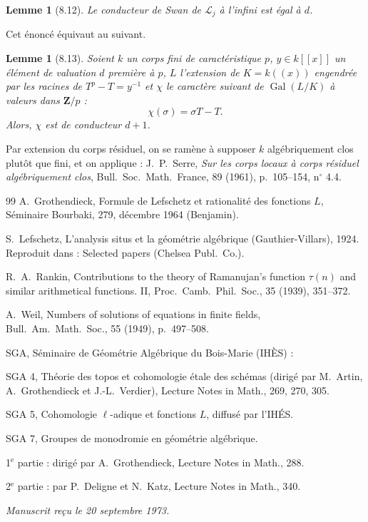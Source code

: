 \documentclass[12pt,a4paper]{amsart}
\theoremstyle{plain}
\newtheorem{lemme}[theoreme]{Lemme}
\theoremstyle{definition}
\theoremstyle{remark}
\DeclareMathOperator{\Gal}{Gal}
\newcommand{\Z}{\mathbf{Z}}
\numberwithin{equation}{section}
\begin{document}
\begin{lemme}[8.12]\label{lem:8.12}
Le conducteur de Swan de $\mathscr{L}_j$ \`a l'infini est \'egal \`a $d$.
\end{lemme}

Cet \'enonc\'e \'equivaut au suivant.

\begin{lemme}[8.13]\label{lem:8.13}
Soient $k$ un corps fini de caract\'eristique $p$, $y\in k[[x]]$ un \'el\'ement de valuation $d$ premi\`ere \`a $p$, $L$ l'extension de $K=k((x))$ engendr\'ee par les racines de $T^p-T=y^{-1}$ et $\chi$ le caract\`ere suivant de $\Gal(L/K)$ \`a valeurs dans $\Z/p$ :
\[
\chi(\sigma) = \sigma T - T.
\]
Alors, $\chi$ est de conducteur $d+1$.
\end{lemme}

Par extension du corps r\'esiduel, on se ram\`ene \`a supposer $k$ alg\'ebriquement clos plut\^ot que fini, et on applique : J.~P.~Serre, \textit{Sur les corps locaux \`a corps r\'esiduel alg\'ebriquement clos}, Bull.\ Soc.\ Math.\ France, 89 (1961), p.~105--154, n$^\circ$ 4.4.


\begin{thebibliography}{99}
A.~Grothendieck, Formule de Lefschetz et rationalit\'e des fonctions $L$, S\'eminaire Bourbaki, 279, d\'ecembre 1964 (Benjamin).

S.~Lefschetz, L'analysis situs et la g\'eom\'etrie alg\'ebrique (Gauthier-Villars), 1924. Reproduit dans : Selected papers (Chelsea Publ.\ Co.).

R.~A.~Rankin, Contributions to the theory of Ramanujan's function $\tau(n)$ and similar arithmetical functions. II, Proc.\ Camb.\ Phil.\ Soc., 35 (1939), 351--372.

A.~Weil, Numbers of solutions of equations in finite fields, Bull.\ Am.\ Math.\ Soc., 55 (1949), p.~497--508.
\end{thebibliography}

\noindent SGA, S\'eminaire de G\'eom\'etrie Alg\'ebrique du Bois-Marie (IH\`ES) :

SGA 4, Th\'eorie des topos et cohomologie \'etale des sch\'emas (dirig\'e par M.~Artin, A.~Grothendieck et J.-L.~Verdier), Lecture Notes in Math., 269, 270, 305.

SGA 5, Cohomologie $\ell$-adique et fonctions $L$, diffus\'e par l'IH\'ES.

SGA 7, Groupes de monodromie en g\'eom\'etrie alg\'ebrique.

1$^\text{e}$ partie : dirig\'e par A.~Grothendieck, Lecture Notes in Math., 288.

2$^\text{e}$ partie : par P.~Deligne et N.~Katz, Lecture Notes in Math., 340.

\vspace{1cm}
\noindent \textit{Manuscrit re\c{c}u le 20 septembre 1973.}
\end{document}
